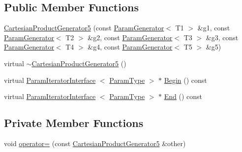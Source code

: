 \subsection*{\-Public \-Member \-Functions}
\begin{DoxyCompactItemize}
\item 
\hyperlink{classtesting_1_1internal_1_1CartesianProductGenerator5_a0d94bed433ec3a1e9bd25fd99d3a8aca}{\-Cartesian\-Product\-Generator5} (const \hyperlink{classtesting_1_1internal_1_1ParamGenerator}{\-Param\-Generator}$<$ \-T1 $>$ \&g1, const \hyperlink{classtesting_1_1internal_1_1ParamGenerator}{\-Param\-Generator}$<$ \-T2 $>$ \&g2, const \hyperlink{classtesting_1_1internal_1_1ParamGenerator}{\-Param\-Generator}$<$ \-T3 $>$ \&g3, const \hyperlink{classtesting_1_1internal_1_1ParamGenerator}{\-Param\-Generator}$<$ \-T4 $>$ \&g4, const \hyperlink{classtesting_1_1internal_1_1ParamGenerator}{\-Param\-Generator}$<$ \-T5 $>$ \&g5)
\item 
virtual \hyperlink{classtesting_1_1internal_1_1CartesianProductGenerator5_a4464aebb0bf2d2129f5c982a90fba508}{$\sim$\-Cartesian\-Product\-Generator5} ()
\item 
virtual \hyperlink{classtesting_1_1internal_1_1ParamIteratorInterface}{\-Param\-Iterator\-Interface}\*
$<$ \hyperlink{classtesting_1_1internal_1_1CartesianProductGenerator5_a39880336d68d34bdc77e7e8726d38a91}{\-Param\-Type} $>$ $\ast$ \hyperlink{classtesting_1_1internal_1_1CartesianProductGenerator5_ab6a1e6ee0c9095fec4ca7dd2fe9736cd}{\-Begin} () const 
\item 
virtual \hyperlink{classtesting_1_1internal_1_1ParamIteratorInterface}{\-Param\-Iterator\-Interface}\*
$<$ \hyperlink{classtesting_1_1internal_1_1CartesianProductGenerator5_a39880336d68d34bdc77e7e8726d38a91}{\-Param\-Type} $>$ $\ast$ \hyperlink{classtesting_1_1internal_1_1CartesianProductGenerator5_a2175654afa23856e885489861c353c72}{\-End} () const 
\end{DoxyCompactItemize}
\subsection*{\-Private \-Member \-Functions}
\begin{DoxyCompactItemize}
\item 
void \hyperlink{classtesting_1_1internal_1_1CartesianProductGenerator5_a994db032c38050ea9e65d6658e5e44b6}{operator=} (const \hyperlink{classtesting_1_1internal_1_1CartesianProductGenerator5}{\-Cartesian\-Product\-Generator5} \&other)
\end{DoxyCompactItemize}
